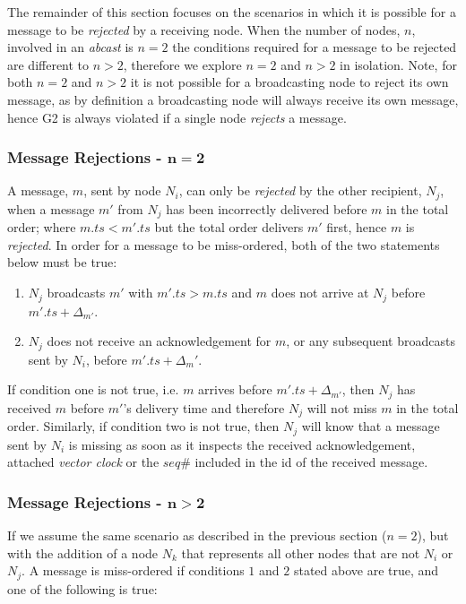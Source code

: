 		The remainder of this section focuses on the scenarios in which it is possible for a message to be \emph{rejected} by a receiving node.  When the number of nodes, $n$, involved in an \emph{abcast} is $n=2$ the conditions required for a message to be rejected are different to $n > 2$, therefore we explore $n=2$ and $n>2$ in isolation. Note, for both $n=2$ and $n>2$ it is not possible for a broadcasting node to reject its own message, as by definition a broadcasting node will always receive its own message, hence G2 is always violated if a single node \emph{rejects} a message.  
		
        \subsubsection*{Message Rejections - $\boldsymbol{n = 2}$}
        A message, $m$, sent by node $N_i$, can only be \emph{rejected} by the other recipient, $N_j$, when a message $m'$ from $N_j$ has been incorrectly delivered before $m$ in the total order; where $m.ts < m'.ts$ but the total order delivers $m'$ first, hence $m$ is \emph{rejected}.  In order for a message to be miss-ordered, both of the two statements below must be true:
        
        \begin{enumerate}
            \item $N_j$ broadcasts $m'$ with $m'.ts > m.ts$ and $m$ does not arrive at $N_j$ before $m'.ts + \Delta_{m'}$.  
            \item $N_j$ does not receive an acknowledgement for $m$, or any subsequent broadcasts sent by $N_i$, before $m'.ts + \Delta_m'$.   
        \end{enumerate}
        
        If condition one is not true, i.e. $m$ arrives before $m'.ts + \Delta_{m'}$, then $N_j$ has received $m$ before $m'$'s delivery time and therefore $N_j$ will not miss $m$ in the total order.  Similarly, if condition two is not true, then $N_j$ will know that a message sent by $N_i$ is missing as soon as it inspects the received acknowledgement, attached \emph{vector clock} or the $seq\#$ included in the id of the received message.  
        
        \subsubsection*{Message Rejections - $\boldsymbol{n > 2}$}
        If we assume the same scenario as described in the previous section ($n=2$), but with the addition of a node $N_k$ that represents all other nodes that are not $N_i$ or $N_j$.  A message is miss-ordered if conditions $1$ and $2$ stated above are true, and one of the following is true:
        
